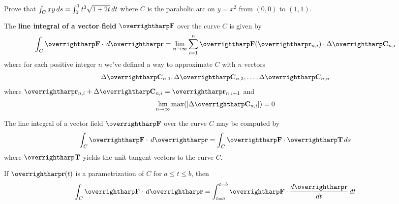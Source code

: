 \documentclass[letterpaper, twoside, 12pt]{book}
\begin{document}
          \begin{solution}

          \end{solution}

          \begin{contributors}

          \end{contributors}

          \begin{problem}
            Prove that $\int_C xy\,d{s}=\int_0^1 t^3\sqrt{1+2t}\,d{t}$
            where $C$ is the parabolic arc
            on $y=x^2$ from $(0,0)$ to $(1,1)$.
          \end{problem}

          \begin{solution}

          \end{solution}

          \begin{contributors}

          \end{contributors}

\begin{definition}
The \textbf{line integral of a vector field} $\vect F$
over the curve $C$ is given by
  \[
    \int_C \vect F\cdot\dvar{\vect r} =
    \lim_{n\to\infty}\sum_{i=1}^n
    \vect F(\vect{r}_{n,i})\cdot\Delta\vect{C}_{n,i}
  \]
where for each positive integer $n$ we've defined a way to approximate $C$
with $n$ vectors
  \[
    \Delta \vect{C}_{n,1},\Delta \vect{C}_{n,2},\dots,\Delta \vect{C}_{n,n}
  \]
where $\vect{r}_{n,i}+\Delta \vect{C}_{n,i}=\vect{r}_{n,i+1}$
and
  \[
    \lim_{n\to\infty} \max(|\Delta \vect{C}_{n,i}|) = 0
  \]
\end{definition}

\begin{definition}
The line integral of a vector field $\vect F$ over the curve $C$
may be computed by
    \[
      \int_C \vect{F}\cdot\dvar{\vect r}
        =
      \int_C \vect{F}\cdot\vect{T}\dvar{s}
    \]
where $\vect T$ yields the unit tangent vectors to the curve $C$.
\end{definition}

\begin{definition}
If $\vect{r}(t)$ is a parametrization of $C$ for $a \leq t \leq b$, then
    \[
      \int_C \vect{F}\cdot\dvar{\vect r}
        =
      \int_{t=a}^{t=b} \vect{F}\cdot\frac{d\vect{r}}{dt}\dvar{t}
    \]
\end{definition}
\end{document}
